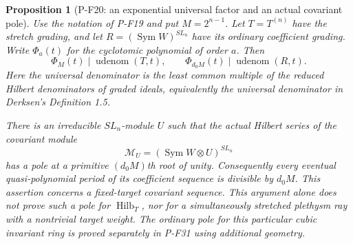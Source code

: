 \documentclass[11pt,a4paper]{article}
\newtheorem{proposition}{Proposition}[section]
\begin{document}
\begin{proposition}[P-F20: an exponential universal factor and an actual covariant pole]
\label{prop:chainuniversaldenominator}
Use the notation of P-F19 and put $M=2^{n-1}$.
Let $T=T^{(n)}$ have the stretch grading, and let
$R=(\operatorname{Sym}W)^{SL_n}$ have its ordinary coefficient grading.
Write $\Phi_a(t)$ for the cyclotomic polynomial of order $a$.
Then
\[
 \Phi_M(t)\mid\operatorname{udenom}(T,t),\qquad
 \Phi_{d_0M}(t)\mid\operatorname{udenom}(R,t).
 \tag{P-F20a}
\]
Here the universal denominator is the least common multiple of the
reduced Hilbert denominators of graded ideals, equivalently the
universal denominator in Derksen's Definition 1.5.

There is an irreducible $SL_n$-module $U$ such that the actual Hilbert
series of the covariant module
\[
 \mathcal M_U=(\operatorname{Sym}W\otimes U)^{SL_n}
 \tag{P-F20b}
\]
has a pole at a primitive $(d_0M)$th root of unity.
Consequently every eventual quasi-polynomial period of its coefficient
sequence is divisible by $d_0M$.
This assertion concerns a fixed-target covariant sequence. This
argument alone does not prove such a pole for $\operatorname{Hilb}_T$,
nor for a simultaneously stretched plethysm ray with a nontrivial
target weight. The ordinary pole for this particular cubic invariant
ring is proved separately in P-F31 using additional geometry.
\end{proposition}
\end{document}
